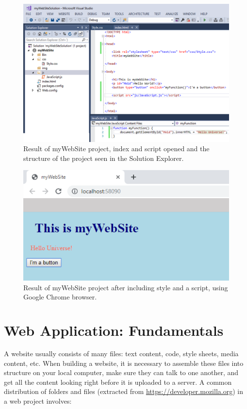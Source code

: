 \begin{figure}
    \centering
    \includegraphics[width= \textwidth]{Figures/Projects/js1bis}
    \caption{Result of myWebSite project, index and script opened and the structure of the project seen in the Solution Explorer.}
    \label{fig:js1}
\end{figure}

\begin{figure}
    \centering
    \includegraphics[width= \textwidth]{Figures/Projects/js2}
    \caption{Result of myWebSite project after including style and a script, using Google Chrome browser.}
    \label{fig:js2}
\end{figure}



    \FloatBarrier
    \section{Web Application: Fundamentals}

A website usually consists of many files: text content, code, style sheets, media content, etc. When building a website, it is necessary to assemble these files into structure on your local computer, make sure they can talk to one another, and get all the content looking right before it is uploaded to a server. A common distribution of folders and files (extracted from \url{https://developer.mozilla.org}) in a web project involves:

